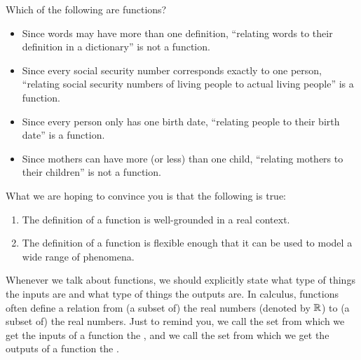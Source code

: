 \documentclass{ximera}
\begin{document}
\begin{question}
  Which of the following are functions?
  \begin{selectAll}
  \end{selectAll}
  \begin{feedback}\hfil
    \begin{itemize}
    \item Since words may have more than one definition, ``relating
      words to their definition in a dictionary'' is not a function.
    \item Since every social security number corresponds exactly to
      one person, ``relating social security numbers of living people
      to actual living people'' is a function.
    \item Since every person only has one birth date, ``relating
      people to their birth date'' is a function.
      \item Since mothers can have more (or less) than one child,
        ``relating mothers to their children'' is not a function.
    \end{itemize}
  \end{feedback}
\end{question}

What we are hoping to convince you is that the following is true:
\begin{enumerate}
\item The definition of a function is well-grounded in a real context.
\item The definition of a function is flexible enough that it can be
  used to model a wide range of phenomena.
\end{enumerate}


Whenever we talk about functions, we should explicitly state
what type of things the inputs are and what type of things the outputs
are.  In calculus, functions often define a relation from (a subset
of) the real numbers (denoted by $\mathbb R$) to (a subset of) the real
numbers.  Just to remind you, we call the set from which we get the inputs
of a function the , and we call the set from which 
we get the outputs of a function the .
\end{document}
